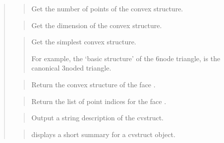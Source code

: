 \documentclass[a4paper,11pt,english]{sphinxmanual}
\begin{document}
\sphinxAtStartPar
{}
\begin{quote}

\sphinxAtStartPar
{}
\begin{quote}

\sphinxAtStartPar
Get the number of points of the convex structure.
\end{quote}

\sphinxAtStartPar
{}
\begin{quote}

\sphinxAtStartPar
Get the dimension of the convex structure.
\end{quote}

\sphinxAtStartPar
{}
\begin{quote}

\sphinxAtStartPar
Get the simplest convex structure.

\sphinxAtStartPar
For example, the ‘basic structure’ of the 6\sphinxhyphen{}node triangle, is the
canonical 3\sphinxhyphen{}noded triangle.
\end{quote}

\sphinxAtStartPar
{}
\begin{quote}

\sphinxAtStartPar
Return the convex structure of the face .
\end{quote}

\sphinxAtStartPar
{}
\begin{quote}

\sphinxAtStartPar
Return the list of point indices for the face .
\end{quote}

\sphinxAtStartPar
{}
\begin{quote}

\sphinxAtStartPar
Output a string description of the cvstruct.
\end{quote}

\sphinxAtStartPar
{}
\begin{quote}

\sphinxAtStartPar
displays a short summary for a cvstruct object.
\end{quote}
\end{quote}
\end{document}
